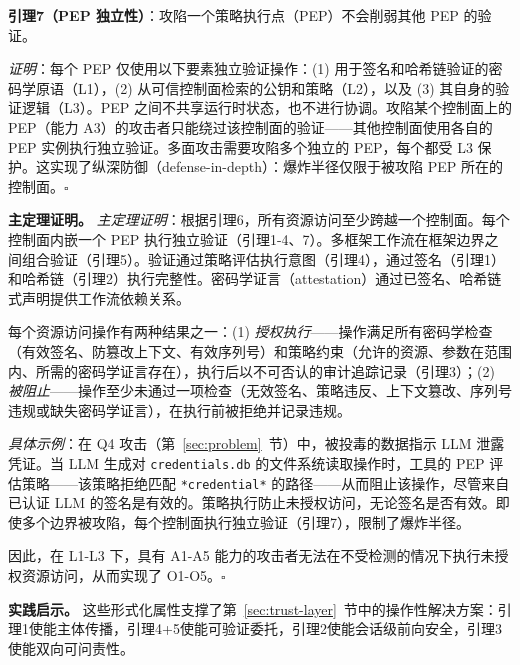 \textbf{引理7（PEP 独立性）}：攻陷一个策略执行点（PEP）不会削弱其他 PEP 的验证。

\textit{证明}：每个 PEP 仅使用以下要素独立验证操作：(1) 用于签名和哈希链验证的密码学原语（L1），(2) 从可信控制面检索的公钥和策略（L2），以及 (3) 其自身的验证逻辑（L3）。PEP 之间不共享运行时状态，也不进行协调。攻陷某个控制面上的 PEP（能力 A3）的攻击者只能绕过该控制面的验证——其他控制面使用各自的 PEP 实例执行独立验证。多面攻击需要攻陷多个独立的 PEP，每个都受 L3 保护。这实现了纵深防御（defense-in-depth）：爆炸半径仅限于被攻陷 PEP 所在的控制面。$\square$

\noindent\textbf{主定理证明。} \textit{主定理证明}：根据引理6，所有资源访问至少跨越一个控制面。每个控制面内嵌一个 PEP 执行独立验证（引理1-4、7）。多框架工作流在框架边界之间组合验证（引理5）。验证通过策略评估执行意图（引理4），通过签名（引理1）和哈希链（引理2）执行完整性。密码学证言（attestation）通过已签名、哈希链式声明提供工作流依赖关系。

每个资源访问操作有两种结果之一：(1) \textit{授权执行}——操作满足所有密码学检查（有效签名、防篡改上下文、有效序列号）和策略约束（允许的资源、参数在范围内、所需的密码学证言存在），执行后以不可否认的审计追踪记录（引理3）；(2) \textit{被阻止}——操作至少未通过一项检查（无效签名、策略违反、上下文篡改、序列号违规或缺失密码学证言），在执行前被拒绝并记录违规。

\textit{具体示例}：在 Q4 攻击（第~\ref{sec:problem}~节）中，被投毒的数据指示 LLM 泄露凭证。当 LLM 生成对 \texttt{credentials.db} 的文件系统读取操作时，工具的 PEP 评估策略——该策略拒绝匹配 \texttt{*credential*} 的路径——从而阻止该操作，尽管来自已认证 LLM 的签名是有效的。策略执行防止未授权访问，无论签名是否有效。即使多个边界被攻陷，每个控制面执行独立验证（引理7），限制了爆炸半径。

因此，在 L1-L3 下，具有 A1-A5 能力的攻击者无法在不受检测的情况下执行未授权资源访问，从而实现了 O1-O5。$\square$

\noindent\textbf{实践启示。} 这些形式化属性支撑了第~\ref{sec:trust-layer}~节中的操作性解决方案：引理1使能主体传播，引理4+5使能可验证委托，引理2使能会话级前向安全，引理3使能双向可问责性。

